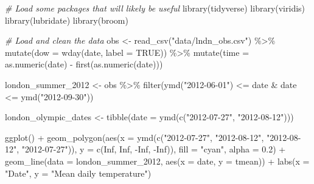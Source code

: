 \documentclass[
]{book}
\newenvironment{Shaded}{\begin{snugshade}}{\end{snugshade}}
\newcommand{\AttributeTok}[1]{\textcolor[rgb]{0.77,0.63,0.00}{#1}}
\newcommand{\CommentTok}[1]{\textcolor[rgb]{0.56,0.35,0.01}{\textit{#1}}}
\newcommand{\ConstantTok}[1]{\textcolor[rgb]{0.00,0.00,0.00}{#1}}
\newcommand{\FloatTok}[1]{\textcolor[rgb]{0.00,0.00,0.81}{#1}}
\newcommand{\FunctionTok}[1]{\textcolor[rgb]{0.00,0.00,0.00}{#1}}
\newcommand{\NormalTok}[1]{#1}
\newcommand{\OtherTok}[1]{\textcolor[rgb]{0.56,0.35,0.01}{#1}}
\newcommand{\SpecialCharTok}[1]{\textcolor[rgb]{0.00,0.00,0.00}{#1}}
\newcommand{\StringTok}[1]{\textcolor[rgb]{0.31,0.60,0.02}{#1}}
\begin{document}
\begin{Shaded}
\begin{Highlighting}[]
\CommentTok{\# Load some packages that will likely be useful}
\FunctionTok{library}\NormalTok{(tidyverse)}
\FunctionTok{library}\NormalTok{(viridis)}
\FunctionTok{library}\NormalTok{(lubridate)}
\FunctionTok{library}\NormalTok{(broom)}

\CommentTok{\# Load and clean the data}
\NormalTok{obs }\OtherTok{\textless{}{-}} \FunctionTok{read\_csv}\NormalTok{(}\StringTok{"data/lndn\_obs.csv"}\NormalTok{) }\SpecialCharTok{\%\textgreater{}\%} 
  \FunctionTok{mutate}\NormalTok{(}\AttributeTok{dow =} \FunctionTok{wday}\NormalTok{(date, }\AttributeTok{label =} \ConstantTok{TRUE}\NormalTok{)) }\SpecialCharTok{\%\textgreater{}\%} 
  \FunctionTok{mutate}\NormalTok{(}\AttributeTok{time =} \FunctionTok{as.numeric}\NormalTok{(date) }\SpecialCharTok{{-}} \FunctionTok{first}\NormalTok{(}\FunctionTok{as.numeric}\NormalTok{(date)))}
\end{Highlighting}
\end{Shaded}

\begin{Shaded}
\begin{Highlighting}[]
\NormalTok{london\_summer\_2012 }\OtherTok{\textless{}{-}}\NormalTok{ obs }\SpecialCharTok{\%\textgreater{}\%} 
  \FunctionTok{filter}\NormalTok{(}\FunctionTok{ymd}\NormalTok{(}\StringTok{"2012{-}06{-}01"}\NormalTok{) }\SpecialCharTok{\textless{}=}\NormalTok{ date }\SpecialCharTok{\&}\NormalTok{ date }\SpecialCharTok{\textless{}=} \FunctionTok{ymd}\NormalTok{(}\StringTok{"2012{-}09{-}30"}\NormalTok{))}

\NormalTok{london\_olympic\_dates }\OtherTok{\textless{}{-}} \FunctionTok{tibble}\NormalTok{(}\AttributeTok{date =} \FunctionTok{ymd}\NormalTok{(}\FunctionTok{c}\NormalTok{(}\StringTok{"2012{-}07{-}27"}\NormalTok{, }\StringTok{"2012{-}08{-}12"}\NormalTok{)))}

\FunctionTok{ggplot}\NormalTok{() }\SpecialCharTok{+} 
  \FunctionTok{geom\_polygon}\NormalTok{(}\FunctionTok{aes}\NormalTok{(}\AttributeTok{x =} \FunctionTok{ymd}\NormalTok{(}\FunctionTok{c}\NormalTok{(}\StringTok{"2012{-}07{-}27"}\NormalTok{, }\StringTok{"2012{-}08{-}12"}\NormalTok{, }
                             \StringTok{"2012{-}08{-}12"}\NormalTok{, }\StringTok{"2012{-}07{-}27"}\NormalTok{)), }
                   \AttributeTok{y =} \FunctionTok{c}\NormalTok{(}\ConstantTok{Inf}\NormalTok{, }\ConstantTok{Inf}\NormalTok{, }\SpecialCharTok{{-}}\ConstantTok{Inf}\NormalTok{, }\SpecialCharTok{{-}}\ConstantTok{Inf}\NormalTok{)), }\AttributeTok{fill =} \StringTok{"cyan"}\NormalTok{, }\AttributeTok{alpha =} \FloatTok{0.2}\NormalTok{) }\SpecialCharTok{+} 
  \FunctionTok{geom\_line}\NormalTok{(}\AttributeTok{data =}\NormalTok{ london\_summer\_2012, }\FunctionTok{aes}\NormalTok{(}\AttributeTok{x =}\NormalTok{ date, }\AttributeTok{y =}\NormalTok{ tmean)) }\SpecialCharTok{+} 
  \FunctionTok{labs}\NormalTok{(}\AttributeTok{x =} \StringTok{"Date"}\NormalTok{, }\AttributeTok{y =} \StringTok{"Mean daily temperature"}\NormalTok{)}
\end{Highlighting}
\end{Shaded}
\end{document}
